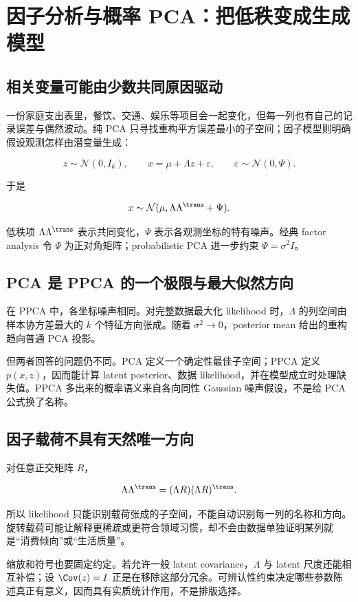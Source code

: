 \section{因子分析与概率 PCA：把低秩变成生成模型}

\subsection{相关变量可能由少数共同原因驱动}

一份家庭支出表里，餐饮、交通、娱乐等项目会一起变化，但每一列也有自己的记录误差与偶然波动。纯 PCA 只寻找重构平方误差最小的子空间；因子模型则明确假设观测怎样由潜变量生成：

\[
z\sim\mathcal N(0,I_k),
\qquad
x=\mu+\Lambda z+\varepsilon,
\qquad
\varepsilon\sim\mathcal N(0,\Psi).
\]

于是

\[
x\sim\mathcal N(\mu,\Lambda\Lambda^\trans+\Psi).
\]

低秩项 \(\Lambda\Lambda^\trans\) 表示共同变化，\(\Psi\) 表示各观测坐标的特有噪声。经典 factor analysis 令 \(\Psi\) 为正对角矩阵；probabilistic PCA 进一步约束 \(\Psi=\sigma^2I\)。

\subsection{PCA 是 PPCA 的一个极限与最大似然方向}

在 PPCA 中，各坐标噪声相同。对完整数据最大化 likelihood 时，\(\Lambda\) 的列空间由样本协方差最大的 \(k\) 个特征方向张成。随着 \(\sigma^2\to0\)，posterior mean 给出的重构趋向普通 PCA 投影。

但两者回答的问题仍不同。PCA 定义一个确定性最佳子空间；PPCA 定义 \(p(x,z)\)，因而能计算 latent posterior、数据 likelihood，并在模型成立时处理缺失值。PPCA 多出来的概率语义来自各向同性 Gaussian 噪声假设，不是给 PCA 公式换了名称。

\subsection{因子载荷不具有天然唯一方向}

对任意正交矩阵 \(R\)，

\[
\Lambda\Lambda^\trans
=(\Lambda R)(\Lambda R)^\trans.
\]

所以 likelihood 只能识别载荷张成的子空间，不能自动识别每一列的名称和方向。旋转载荷可能让解释更稀疏或更符合领域习惯，却不会由数据单独证明某列就是“消费倾向”或“生活质量”。

缩放和符号也要固定约定。若允许一般 latent covariance，\(\Lambda\) 与 latent 尺度还能相互补偿；设 \(\Cov(z)=I\) 正是在移除这部分冗余。可辨认性约束决定哪些参数陈述真正有意义，因而具有实质统计作用，不是排版选择。


